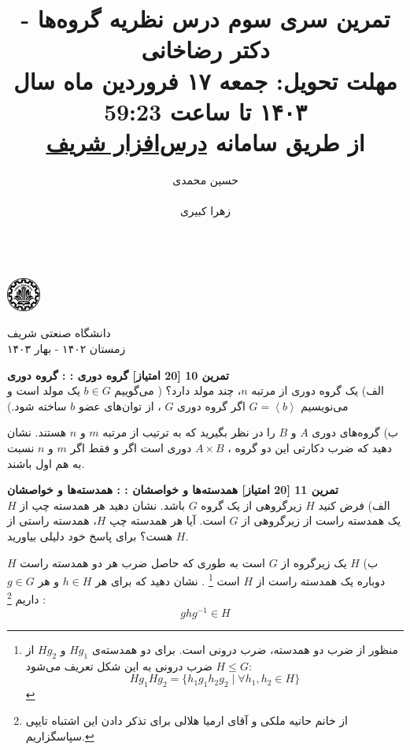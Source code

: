 \documentclass{article}
\title{
	\vspace{-0.8em}
تمرین سری سوم درس نظریه گروه‌ها - دکتر رضاخانی
\\
{\normalsize
\textbf{مهلت تحویل:
جمعه ۱۷ فروردین ماه سال ۱۴۰۳ تا ساعت 59:23
\\
\vspace{-0.4em}
از طریق سامانه
\href{https://cw.sharif.edu/}{درس‌افزار شریف}
}
}
\vspace{-0.6em}
}
\author{
حسین محمدی\\
  \lr{
  		\href{mailto:hossein.mohammadi.00427@gmail.com}{\texttt{	hossein.mohammadi.00427@gmail.com}}} \\
  \And
  زهرا کبیری\\
 \lr{
  		\href{mailto:kabiri.zahra98@gmail.com}{ \texttt{kabiri.zahra98@gmail.com}}}\\
  }
\newenvironment{exercise}[3][\unskip]{%
	\par
	\noindent
	\textbf{تمرین
		#1
		[#2 امتیاز] 
		\def\temp{#3}\ifx\temp\empty
		: 
		\else
		: #3 \vspace{0.5em} \\ \noindent
		\fi
}}{}
\begin{document}
\begin{minipage}{0.1\textwidth}%
\includegraphics[width=1.1cm]{sharif-logo.png}
\end{minipage}%
\hfill%
\begin{minipage}{0.9\textwidth}\raggedleft
دانشگاه صنعتی شریف\\
زمستان ۱۴۰۲ - بهار ۱۴۰۳\\
\end{minipage}

\makepertitle

\begin{exercise}[10]{20}{گروه دور‌ی }
	الف) یک گروه دوری
	از مرتبه 
	$n$، 
	چند مولد دارد؟
	(
	می‌گوییم
	$b\in G$ 
	یک مولد است و می‌نویسیم
	$G = \left < b \right >$
	 اگر گروه دوری 
	$G$ 
	،
	از توان‌های عضو $b$ ساخته شود.) 
	
	\noindent
	\vspace{0.25em}
	ب) گروه‌های دوری 
	$A$ 
	و 
	$B$ 
	را در نظر بگیرید که به ترتیب از مرتبه 
	$m$ 
	و 
	$n$ 
	هستند. نشان دهید که ضرب دکارتی این دو گروه ،
	$A \times B$ 
	دوری است اگر و فقط اگر 
	$m$ 
	و 
	$n$ 
	نسبت به هم اول باشند.
	\\
	
\end{exercise}


\begin{exercise}[11]{20}{همدسته‌ها و خواصشان}
	الف) فرض کنید 
	$H$ 
	زیرگروهی از یک گروه 
	$G$ 
	باشد. نشان دهید هر همدسته چپ از 
	$H$ 
	یک همدسته راست از زیرگروهی از 
	$G$ 
	است. آیا هر همدسته چپ 
	$H$، 
	همدسته راستی از 
	$H$ 
	هست؟ برای پاسخ خود دلیلی بیاورید.
	
	\noindent
	\vspace{0.25em}
	ب)  
	$H$ 
	یک زیرگروه از 
	$G$ 
	است به طوری که حاصل ضرب هر دو همدسته راست 
	$H$ 
	دوباره یک همدسته راست از 
	$H$ 
	است
	\footnote{منظور از ضرب دو‌ همدسته، ضرب درونی است. برای دو همدسته‌ی  
	$Hg_1$ و $Hg_2$ از  $H\leq G$ ضرب درونی به این شکل تعریف می‌شود:
	\[
	Hg_1Hg_2 = \{h_1g_1h_2g_2 \; | \; \forall h_1,h_2\in H \}
	\]
	}
	. نشان دهید که برای هر 
	$h \in H$ 
	و هر 
	$g\in G$
	داریم
	\footnote{از خانم حانیه ملکی و آقای ارمیا هلالی برای تذکر دادن این اشتباه تایپی سپاسگزاریم.}
	:
	\begin{equation*}
		ghg^{-1} \in H
	\end{equation*}
\end{exercise}
\end{document}
